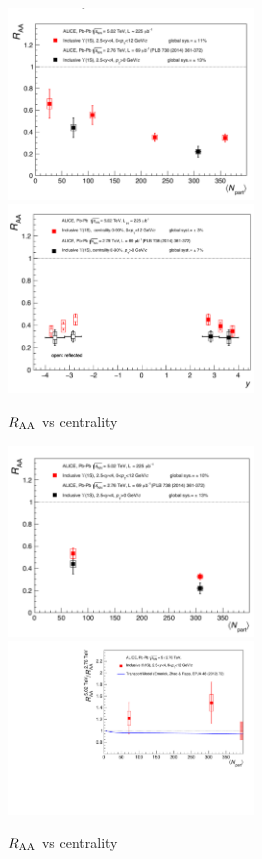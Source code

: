 \begin{figure}[!h]
  \centering \includegraphics[width=6.5cm]{Results/Antoine_results_2016_06_07/RAA_vs_cent_5TeV_et_2760GeV.pdf}
  \centering \includegraphics[width=6.5cm]{Results/Antoine_results_2016_06_07/RAA_vs_rap_5TeV_et_2760GeV.pdf}
  \caption{\label{raaAlice}\scriptsize $R_{\rm AA}$ vs centrality}
\end{figure}       

\begin{figure}[!h]
  \centering \includegraphics[width=6.5cm]{Results/Antoine_results_2016_06_07/RAA_vs_cent_5TeV_et_2760GeV_same_binning.pdf}
  \centering \includegraphics[width=6.5cm]{Results/Antoine_results_2016_06_07/RAA_vs_cent_5TeV_et_2760GeV_ratio.pdf}
  \caption{\label{ratio}\scriptsize $R_{\rm AA}$ vs centrality}
\end{figure}       

